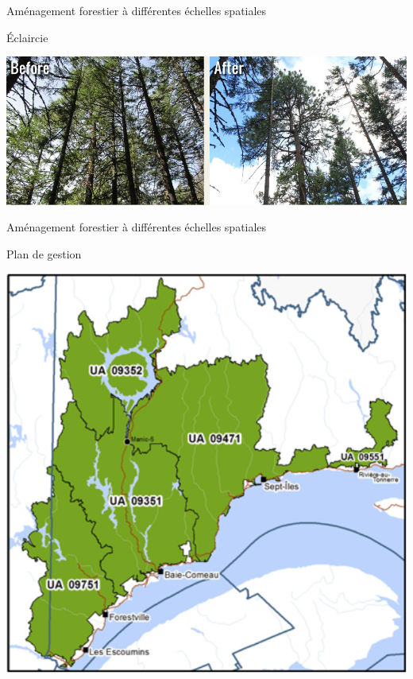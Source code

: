 \documentclass[11pt, compress, aspectratio=1610]{beamer}
\begin{document}
\begin{frame}{Aménagement forestier à différentes échelles spatiales}
\protect\hypertarget{amuxe9nagement-forestier-uxe0-diffuxe9rentes-uxe9chelles-spatiales}{}

Éclaircie

\centering

\includegraphics[scale=0.338]{figures/thinning}

\par

\end{frame}

\begin{frame}{Aménagement forestier à différentes échelles spatiales}
\protect\hypertarget{amuxe9nagement-forestier-uxe0-diffuxe9rentes-uxe9chelles-spatiales-1}{}

\vspace*{-7mm}

Plan de gestion

\centering

\includegraphics[scale=0.28]{figures/planGestion}

\par

\end{frame}
\end{document}
